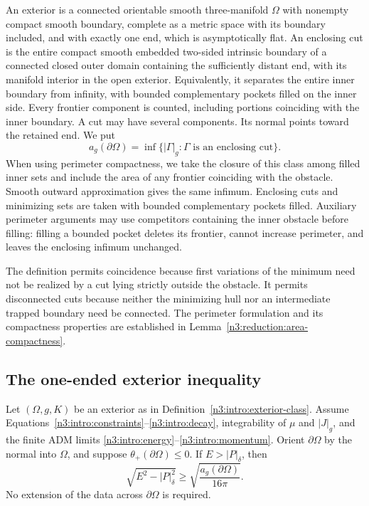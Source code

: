\begin{definition}\label{n3:intro:exterior-class}
An exterior is a connected orientable smooth three-manifold \(\Omega\)
with nonempty compact smooth boundary, complete as a metric space with
its boundary included, and with exactly one end, which is asymptotically flat.
An enclosing cut is the entire compact smooth embedded two-sided intrinsic
boundary of a connected closed outer domain containing the sufficiently
distant end, with its manifold interior in the open exterior. Equivalently,
it separates the entire inner boundary from infinity, with bounded
complementary pockets filled on the inner side. Every frontier component is
counted, including portions coinciding with the inner boundary. A cut may
have several components. Its normal points toward the retained end. We put
\[
 a_g(\partial\Omega)=
  \inf\{|\Gamma|_g:\Gamma\text{ is an enclosing cut}\}.
\]
When using perimeter compactness, we take the closure of this class
among filled inner sets and include the area of any frontier coinciding
with the obstacle. Smooth outward approximation gives the same
infimum. Enclosing cuts and minimizing sets are taken with bounded
complementary pockets filled. Auxiliary perimeter arguments may use
competitors containing the inner obstacle before filling: filling a bounded
pocket deletes its frontier, cannot increase perimeter, and leaves the enclosing
infimum unchanged.
\end{definition}

The definition permits coincidence because first variations of the
minimum need not be realized by a cut lying strictly outside the
obstacle. It permits disconnected cuts because neither the minimizing
hull nor an intermediate trapped boundary need be connected. The
perimeter formulation and its compactness properties are established
in Lemma~\ref{n3:reduction:area-compactness}.

\subsection{The one-ended exterior inequality}

\begin{theorem}\label{n3:intro:exterior-inequality}
Let \((\Omega,g,K)\) be an exterior as in
Definition~\ref{n3:intro:exterior-class}. Assume
Equations~\eqref{n3:intro:constraints}--\eqref{n3:intro:decay}, integrability
of \(\mu\) and \(|J|_g\), and the finite ADM limits
\eqref{n3:intro:energy}--\eqref{n3:intro:momentum}. Orient \(\partial\Omega\)
by the normal into \(\Omega\), and suppose
\(\theta_+(\partial\Omega)\le0\). If \(E>|P|_\delta\), then
\begin{equation}\label{n3:intro:penrose}
          \sqrt{E^2-|P|_\delta^2}
               \ge \sqrt{\frac{a_g(\partial\Omega)}{16\pi}}.
\end{equation}
No extension of the data across \(\partial\Omega\) is required.
\end{theorem}


